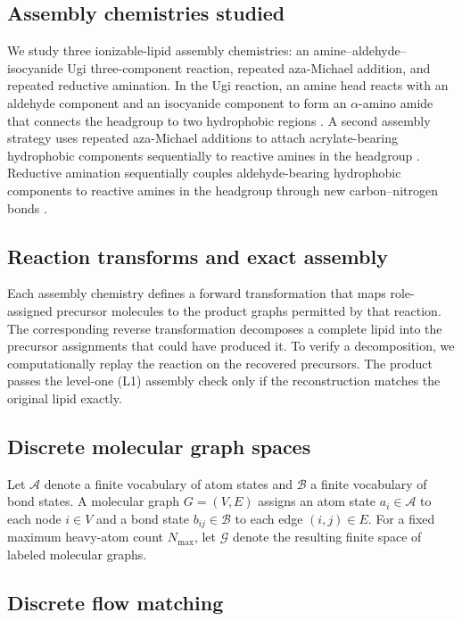 \documentclass{article}
\begin{document}
\subsection{Assembly chemistries studied}

We study three ionizable-lipid assembly chemistries: an
amine--aldehyde--isocyanide Ugi three-component reaction, repeated aza-Michael addition, and
repeated reductive amination.
In the Ugi reaction, an amine head reacts with an aldehyde component and an isocyanide
component to form an $\alpha$-amino amide that connects the headgroup to two hydrophobic regions
\citep{xu2024agile}.
A second assembly strategy uses repeated aza-Michael additions to attach acrylate-bearing
hydrophobic components sequentially to reactive amines in the headgroup
\citep{li2023combinatorial}.
Reductive amination sequentially couples aldehyde-bearing hydrophobic components to reactive amines
in the headgroup through new carbon--nitrogen bonds \citep{xue2024barcoding}.

\subsection{Reaction transforms and exact assembly}

Each assembly chemistry defines a forward transformation that maps role-assigned precursor
molecules to the product graphs permitted by that reaction.
The corresponding reverse transformation decomposes a complete lipid into the precursor
assignments that could have produced it.
To verify a decomposition, we computationally replay the reaction on the recovered precursors.
The product passes the level-one (L1) assembly check only if the reconstruction matches the original
lipid exactly.

\subsection{Discrete molecular graph spaces}

Let $\mathcal{A}$ denote a finite vocabulary of atom states and $\mathcal{B}$ a finite vocabulary of
bond states.
A molecular graph $G=(V,E)$ assigns an atom state $a_i\in\mathcal{A}$ to each node $i\in V$ and a
bond state $b_{ij}\in\mathcal{B}$ to each edge $(i,j)\in E$.
For a fixed maximum heavy-atom count $N_{\max}$, let $\mathcal{G}$ denote the resulting finite space
of labeled molecular graphs.

\subsection{Discrete flow matching}
\end{document}
